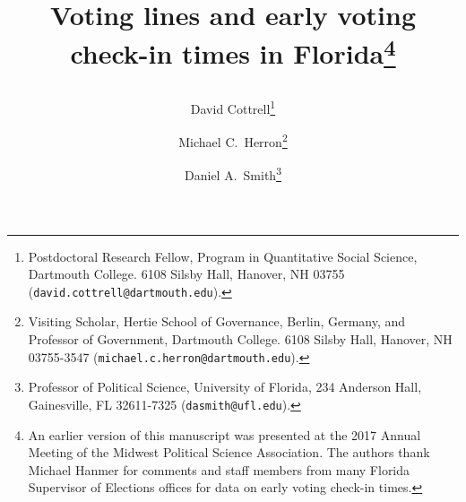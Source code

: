 \documentclass[12pt,titlepage]{article}
\begin{document}
\sloppy
\thispagestyle{empty}


\renewcommand{\topfraction}{.85}
\renewcommand{\bottomfraction}{.7}
\renewcommand{\textfraction}{.15}
\renewcommand{\floatpagefraction}{.66}
\renewcommand{\dbltopfraction}{.66}
\renewcommand{\dblfloatpagefraction}{.66}



\title{Voting lines and early voting check-in times in
  Florida\thanks{An earlier version of this manuscript was presented
    at the 2017 Annual Meeting of the Midwest Political Science
    Association.  The authors thank Michael Hanmer for comments and
    staff members from many Florida Supervisor of Elections offices
    for data on early voting check-in times.}\author{David
    Cottrell\thanks{Postdoctoral Research Fellow, Program in
      Quantitative Social Science, Dartmouth College.  6108 Silsby
      Hall, Hanover, NH 03755
      (\texttt{david.cottrell@dartmouth.edu}).} \and Michael C.\
    Herron\thanks{Visiting Scholar, Hertie School of Governance,
      Berlin, Germany, and Professor of Government, Dartmouth College.
      6108 Silsby Hall, Hanover, NH 03755-3547
      (\texttt{michael.c.herron@dartmouth.edu}).} \and Daniel A.\
    Smith\thanks{Professor of Political Science, University of
      Florida, 234 Anderson Hall, Gainesville, FL 32611-7325
      (\texttt{dasmith@ufl.edu}).}}\vspace{1cm}}

\maketitle \doublespacing 

\end{document}
